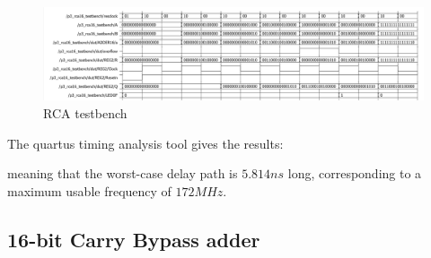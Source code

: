 \documentclass[12pt]{article}
\begin{document}
 \begin{figure}[!h]
	\centering
	\includegraphics[scale = 0.55]{immagini/niki/testbench1.png}
	\caption{RCA testbench}       
\end{figure}
\newpage
The quartus timing analysis tool gives the results:
 \begin{figure}[!h]
 	\centering
 \begin{subfigure}{\linewidth}	
 	\centering
 \end{subfigure}

\end{figure}

meaning that the worst-case delay path is $5.814 ns $ long, corresponding to a maximum usable frequency of $172MHz$.

\subsection{16-bit Carry Bypass adder}
\end{document}
